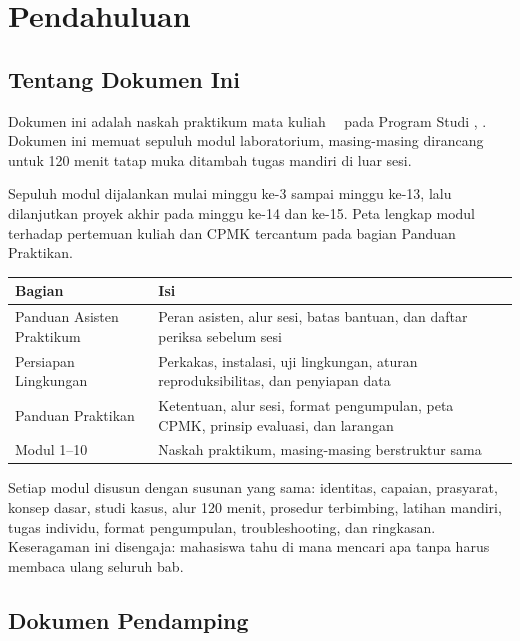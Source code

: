\chapter{Pendahuluan}

\section{Tentang Dokumen Ini}

Dokumen ini adalah naskah praktikum mata kuliah \coursecode\ \coursename\ pada
Program Studi \programname, \universityname. Dokumen ini memuat sepuluh modul
laboratorium, masing-masing dirancang untuk 120 menit tatap muka ditambah tugas
mandiri di luar sesi.

Sepuluh modul dijalankan mulai minggu ke-3 sampai minggu ke-13, lalu dilanjutkan
proyek akhir pada minggu ke-14 dan ke-15. Peta lengkap modul terhadap pertemuan
kuliah dan CPMK tercantum pada bagian Panduan Praktikan.

\begin{center}
\small
\begin{tabular}{@{}p{}>{\raggedright\arraybackslash}p{}@{}}
\toprule
\textbf{Bagian} & \textbf{Isi} \\
\midrule
Panduan Asisten Praktikum & Peran asisten, alur sesi, batas bantuan, dan
  daftar periksa sebelum sesi \\
Persiapan Lingkungan & Perkakas, instalasi, uji lingkungan, aturan
  reproduksibilitas, dan penyiapan data \\
Panduan Praktikan & Ketentuan, alur sesi, format pengumpulan, peta CPMK,
  prinsip evaluasi, dan larangan \\
Modul 1--10 & Naskah praktikum, masing-masing berstruktur sama \\
\bottomrule
\end{tabular}
\end{center}

Setiap modul disusun dengan susunan yang sama: identitas, capaian,
prasyarat, konsep dasar, studi kasus, alur 120 menit, prosedur terbimbing,
latihan mandiri, tugas individu, format pengumpulan, troubleshooting, dan
ringkasan. Keseragaman ini disengaja: mahasiswa tahu di mana mencari apa tanpa
harus membaca ulang seluruh bab.

\section{Dokumen Pendamping}

